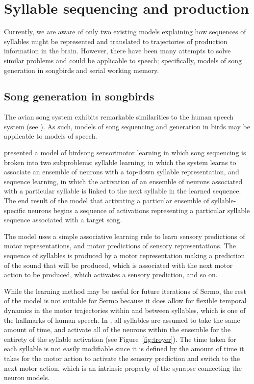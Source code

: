 \section{Syllable sequencing and production}

Currently,
we are aware of only two existing models
explaining how sequences of syllables
might be represented
and translated to trajectories of
production information in the brain.
However, there have been many attempts
to solve similar problems
and could be applicable to speech;
specifically,
models of song generation in songbirds
and serial working memory.

\subsection{Song generation in songbirds}

The avian song system
exhibits remarkable similarities
to the human speech system
(see \citealt{bolhuis2010}).
As such, models of song sequencing
and generation in birds
may be applicable to models of speech.

\citet{troyer2000} presented a model
of birdsong sensorimotor learning
in which song sequencing is broken
into two subproblems:
syllable learning,
in which the system learns
to associate an ensemble of neurons
with a top-down syllable representation,
and sequence learning,
in which the activation
of an ensemble of neurons
associated with a particular syllable
is linked to the next syllable
in the learned sequence.
The end result of the model
that activating a particular
ensemble of syllable-specific neurons
begins a sequence of activations
representing a particular syllable sequence
associated with a target song.

The model uses a
simple associative learning rule
to learn sensory predictions
of motor representations,
and motor predictions
of sensory representations.
The sequence of syllables is produced
by a motor representation
making a prediction of the
sound that will be produced,
which is associated with
the next motor action to be produced,
which activates a sensory prediction,
and so on.


While the learning method
may be useful for future iterations of Sermo,
the rest of the model is not suitable for Sermo
because it does allow for
flexible temporal dynamics
in the motor trajectories within and between syllables,
which is one of the hallmarks of human speech.
In \citet{troyer2000},
all syllables are assumed
to take the same amount of time,
and activate all of the neurons
within the ensemble for the entirety
of the syllable activation
(see Figure~\ref{fig:troyer}).
The time taken for each syllable
is not easily modifiable since
it is defined by the amount of time
it takes for the motor action
to activate the sensory prediction
and switch to the next motor action,
which is an intrinsic property
of the synapse connecting the neuron models.

